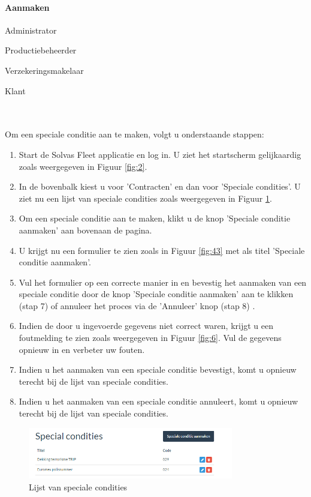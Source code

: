 \documentclass[11pt,openany]{article}
\newcommand{\cmark}{\ding{51}}%
\newcommand{\xmark}{\ding{55}}%
\newcommand{\done}{\rlap{$\square$}{\raisebox{2pt}{\large\hspace{1pt}\cmark}}%
	\hspace{-2.5pt}}
\newcommand{\wontfix}{\rlap{$\square$}{\large\hspace{1pt}\xmark}}
\begin{document}
\paragraph{Aanmaken}
\begin{todolist}
	\item[\done] Administrator
	\item[\done] Productiebeheerder
	\item[\done] Verzekeringsmakelaar
	\item[\wontfix] Klant 
\end{todolist}
\\
\\
Om een speciale conditie aan te maken, volgt u onderstaande stappen:
\begin{enumerate}
	\item Start de Solvas Fleet applicatie en log in. U ziet het startscherm gelijkaardig zoals weergegeven in Figuur \ref{fig:2}.
	\item In de bovenbalk kiest u voor 'Contracten' en dan voor 'Speciale condities'. U ziet nu een lijst van speciale condities zoals weergegeven in Figuur \ref{fig:42}.
	\item Om een speciale conditie aan te maken, klikt u de knop 'Speciale conditie aanmaken' aan bovenaan de pagina. 
	\item U krijgt nu een formulier te zien zoals	 in Figuur \ref{fig:43} met als titel 'Speciale conditie aanmaken'.
	\item Vul het formulier op een correcte manier in en bevestig het aanmaken van een speciale conditie door de knop 'Speciale conditie aanmaken' aan te klikken (stap 7) of annuleer het proces via de 'Annuleer' knop (stap 8) .
	\item Indien de door u ingevoerde gegevens niet correct waren, krijgt u een foutmelding te zien zoals weergegeven in Figuur \ref{fig:6}. Vul de gegevens opnieuw in en verbeter uw fouten.
	\item Indien u het aanmaken van een speciale conditie bevestigt, komt u opnieuw terecht bij de lijst van speciale condities. 
	
	\item Indien u het aanmaken van een speciale conditie annuleert, komt u opnieuw terecht bij de lijst van speciale condities.
	
\end{enumerate}
\begin{figure}
	\centering
	\includegraphics[width=0.8\textwidth]{img/fig42.png}
	\caption{Lijst van speciale condities} 
	\label{fig:42} 
\end{figure}
\end{document}
